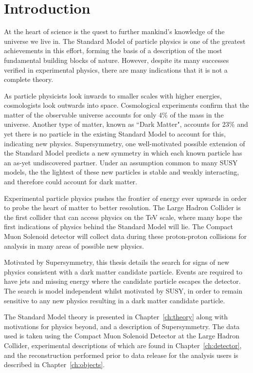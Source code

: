 \setcounter{equation}{0}
\setcounter{figure}{0}
\setcounter{table}{0}

\chapter{\label{chapter1} Introduction}

At the heart of science is the quest to further mankind's knowledge of the universe we live in. The Standard Model of particle physics is one of the greatest achievements in this effort, forming the basis of a description of the most fundamental building blocks of nature. However, despite its many successes verified in experimental physics, there are many indications that it is not a complete theory. 

As particle physicists look inwards to smaller scales with higher energies, cosmologists look outwards into space. Cosmological experiments confirm that the matter of the observable universe accounts for only 4\% of the mass in the universe. Another type of matter, known as ``Dark Matter", accounts for 23\% and yet there is no particle in the existing Standard Model to account for this, indicating new physics.  Supersymmetry, one well-motivated possible extension of the Standard Model predicts a new symmetry in which each known particle has an as-yet undiscovered partner. Under an assumption common to many SUSY models, the the lightest of these new particles is stable and weakly interacting, and therefore could account for dark matter. 

Experimental particle physics pushes the frontier of energy ever upwards in order to probe the heart of matter to better resolution. The Large Hadron Collider is the first collider that can access physics on the TeV scale, where many hope the first indications of physics behind the Standard Model will lie. The Compact Muon Solenoid detector will collect data during these proton-proton collisions for analysis in many areas of possible new physics. 

Motivated by Supersymmetry, this thesis details the search for signs of new physics consistent with a dark matter candidate particle. Events are required to have jets and missing energy where the candidate particle escapes the detector. The search is model independent whilst motivated by SUSY, in order to remain sensitive to any new physics resulting in a dark matter candidate particle. 

The Standard Model theory is presented in Chapter~\ref{ch:theory} along with motivations for physics beyond, and a description of Supersymmetry. The data used is taken using the Compact Muon Solenoid Detector at the Large Hadron Collider, experimental descriptions of which are found in Chapter~\ref{ch:detector}, and the reconstruction performed prior to data release for the analysis users is described in Chapter~\ref{ch:objects}.


